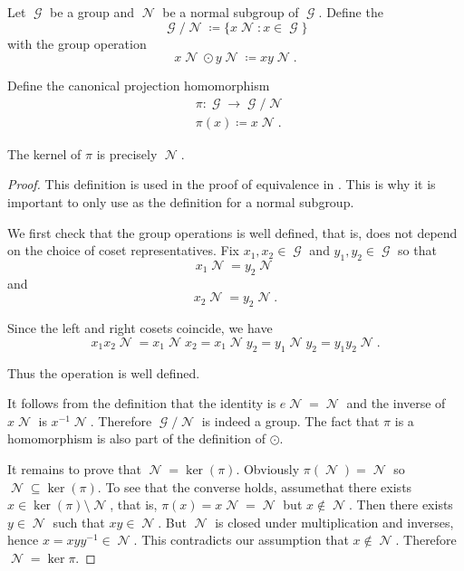 \begin{definition}\label{def:quotient_group}
  Let \( \mscrG \) be a group and \( \mscrN \) be a normal subgroup of \( \mscrG \). Define the 
  \begin{equation*}
    \mscrG / \mscrN \coloneqq \{ x \mscrN \colon x \in \mscrG \}
  \end{equation*}
  with the group operation
  \begin{equation*}
    x \mscrN \odot y \mscrN \coloneqq xy \mscrN.
  \end{equation*}

  Define the canonical projection homomorphism
  \begin{align*}
    &\pi: \mscrG \to \mscrG / \mscrN \\
    &\pi(x) \coloneqq x \mscrN.
  \end{align*}

  The kernel of \( \pi \) is precisely \( \mscrN \).
\end{definition}
\begin{proof}
  This definition is used in the proof of equivalence in . This is why it is important to only use  as the definition for a normal subgroup.

  We first check that the group operations is well defined, that is, does not depend on the choice of coset representatives. Fix \( x_1, x_2 \in \mscrG \) and \( y_1, y_2 \in \mscrG \) so that
  \begin{equation*}
    x_1 \mscrN = y_2 \mscrN
  \end{equation*}
  and
  \begin{equation*}
    x_2 \mscrN = y_2 \mscrN.
  \end{equation*}

  Since the left and right cosets coincide, we have
  \begin{equation*}
    x_1 x_2 \mscrN = x_1 \mscrN x_2 = x_1 \mscrN y_2 = y_1 \mscrN y_2 = y_1 y_2 \mscrN.
  \end{equation*}

  Thus the operation is well defined.

  It follows from the definition that the identity is \( e \mscrN = \mscrN \) and the inverse of \( x \mscrN \) is \( x^{-1} \mscrN \). Therefore \( \mscrG / \mscrN \) is indeed a group. The fact that \( \pi \) is a homomorphism is also part of the definition of \( \odot \).

  It remains to prove that \( \mscrN = \ker(\pi) \). Obviously \( \pi(\mscrN) = \mscrN \) so \( \mscrN \subseteq \ker(\pi) \). To see that the converse holds, assume\DNE that there exists \( x \in \ker(\pi) \setminus \mscrN \), that is, \( \pi(x) = x\mscrN = \mscrN \) but \( x \not\in \mscrN \). Then there exists \( y \in \mscrN \) such that \( xy \in \mscrN \). But \( \mscrN \) is closed under multiplication and inverses, hence \( x = xyy^{-1} \in \mscrN \). This contradicts our assumption that \( x \not\in \mscrN \). Therefore \( \mscrN = \ker \pi \).
\end{proof}

